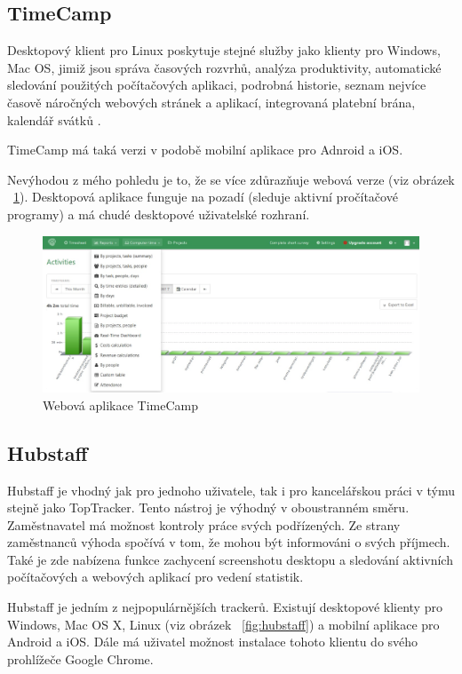 \documentclass[thesis=B,czech]{FITthesis}[2012/06/26]
\begin{document}
\subsection{TimeCamp}
Desktopový klient pro Linux poskytuje stejné služby jako klienty pro Windows, Mac OS, jimiž jsou správa časových rozvrhů, analýza produktivity, automatické sledování použitých počítačových aplikaci, podrobná historie,  seznam nejvíce časově náročných webových stránek a aplikací, integrovaná platební brána, kalendář svátků \cite{timecamp}.
\par
TimeCamp má taká verzi v podobě mobilní aplikace pro Adnroid a iOS.
\par
Nevýhodou z mého pohledu je to, že se více zdůrazňuje webová verze (viz obrázek ~\ref{fig:timecamp}). Desktopová aplikace funguje na pozadí (sleduje aktivní pročítačové programy) a má chudé desktopové uživatelské rozhraní. 

\begin{figure}[h]\centering
	\includegraphics[width=1\textwidth]{timecamp3.jpg}
	\caption[Webová aplikace TimeCamp]{Webová aplikace TimeCamp}\label{fig:timecamp}
\end{figure}

\subsection{Hubstaff}

Hubstaff \cite{hubstaff} je vhodný jak pro jednoho uživatele, tak i pro kancelářskou práci v týmu stejně jako TopTracker. Tento nástroj je výhodný v oboustranném směru. Zaměstnavatel má možnost kontroly práce svých podřízených. Ze strany zaměstnanců výhoda spočívá v tom, že mohou být informováni o svých příjmech. Také je zde nabízena funkce zachycení screenshotu desktopu a sledování aktivních počítačových a webových aplikací pro vedení statistik.
\par
Hubstaff je jedním z nejpopulárnějších trackerů. Existují desktopové klienty pro Windows, Mac OS X, Linux (viz obrázek ~\ref{fig:hubstaff}) a mobilní aplikace pro Android a iOS. Dále má uživatel možnost instalace tohoto klientu do svého prohlížeče Google Chrome. 
\end{document}
